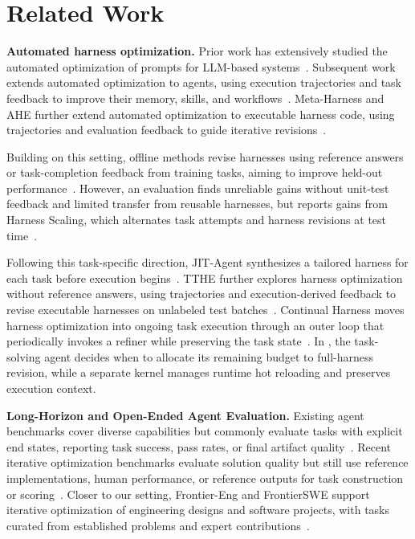 \section{Related Work}
\label{sec:related-work}

\textbf{Automated harness optimization.} Prior work has extensively studied the automated optimization of prompts for LLM-based systems~\citep{zhou2023ape,pryzant2023protegi,yuksekgonul2025textgrad,khattab2024dspy,agrawal2025gepa}. Subsequent work extends automated optimization to agents, using execution trajectories and task feedback to improve their memory, skills, and workflows~\citep{zhao2024expel,zhang2025ace,ni2026trace2skill,hu2024adas,zhang2024aflow}. Meta-Harness and AHE further extend automated optimization to executable harness code, using trajectories and evaluation feedback to guide iterative revisions~\citep{lee2026metaharness,lin2026agentic}.

Building on this setting, offline methods revise harnesses using reference answers or task-completion feedback from training tasks, aiming to improve held-out performance~\citep{park2026autosaddler,zhang2026selfharness,lin2026agentic}. However, an evaluation finds unreliable gains without unit-test feedback and limited transfer from reusable harnesses, but reports gains from Harness Scaling, which alternates task attempts and harness revisions at test time~\citep{wang2026harnessevolution}.

Following this task-specific direction, JIT-Agent synthesizes a tailored harness for each task before execution begins~\citep{zhang2026jita}. TTHE further explores harness optimization without reference answers, using trajectories and execution-derived feedback to revise executable harnesses on unlabeled test batches~\citep{nie2026tthe}. Continual Harness moves harness optimization into ongoing task execution through an outer loop that periodically invokes a refiner while preserving the task state~\citep{karten2026continualharness}. In \boxbox{}, the task-solving agent decides when to allocate its remaining budget to full-harness revision, while a separate kernel manages runtime hot reloading and preserves execution context.

\textbf{Long-Horizon and Open-Ended Agent Evaluation.} Existing agent benchmarks cover diverse capabilities but commonly evaluate tasks with explicit end states, reporting task success, pass rates, or final artifact quality~\citep{mialon2023gaia, liu2024agentbench, jimenez2024swebench, xie2024osworld, merrill2026terminalbench, sun2026agentslastexam}. Recent iterative optimization benchmarks evaluate solution quality but still use reference implementations, human performance, or reference outputs for task construction or scoring~\citep{chan2025mlebench,lyu2026mlsbench,imajuku2025alebench,xu2026autolab,mang2025frontiercs,zhu2026edgebench}. Closer to our setting, Frontier-Eng and FrontierSWE support iterative optimization of engineering designs and software projects, with tasks curated from established problems and expert contributions~\citep{chi2026frontiereng,chu2026frontierswe}.

